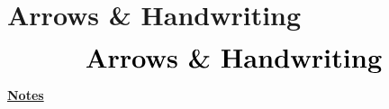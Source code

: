 \documentclass[10pt]{beamer}
\begin{document}
\section{Arrows \& Handwriting}
\begin{frame}
    \begin{eqnarray*}
        &\text{{\huge \textbf{Arrows \& Handwriting}}}\\
    \end{eqnarray*}
\end{frame}
\begin{flushleft}
    \underline{\textbf{Notes}}\setlength{\parskip}{.15cm}\notesize\newline\par
\end{flushleft}
\end{document}
